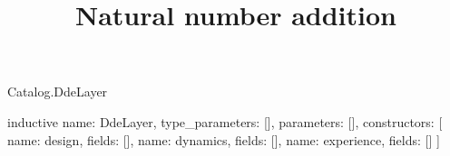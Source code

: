 \begin{lexlean}{Catalog.DdeLayer}
\title{Natural number addition}
\begin{semanticmodule}
inductive{
  name: DdeLayer,
  type_parameters: [],
  parameters: [],
  constructors: [
    {name: design, fields: []},
    {name: dynamics, fields: []},
    {name: experience, fields: []}
  ]
}
\end{semanticmodule}
\end{lexlean}
